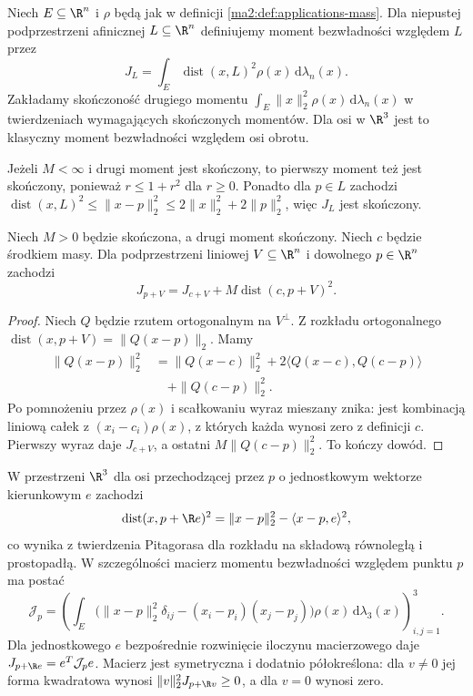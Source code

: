 \begin{definicja}
\label{ma2:def:applications-inertia}
Niech $E\subseteq\R^n$ i $\rho$ będą jak
w definicji \ref{ma2:def:applications-mass}.
Dla niepustej podprzestrzeni afinicznej
$L\subseteq\R^n$ definiujemy moment bezwładności
względem $L$ przez
\[
 J_L=\int_E \operatorname{dist}(x,L)^2
 \rho(x)\,\mathrm d\lambda_n(x).
\]
Zakładamy skończoność drugiego momentu
$\int_E\|x\|_2^2\rho(x)\,\mathrm d\lambda_n(x)$
w twierdzeniach wymagających skończonych momentów.
Dla osi w $\R^3$ jest to klasyczny
moment bezwładności względem osi obrotu.
\end{definicja}

Jeżeli $M<\infty$ i drugi moment jest skończony,
to pierwszy moment też jest skończony, ponieważ
$r\le 1+r^2$ dla $r\ge0$.
Ponadto dla $p\in L$ zachodzi
$\operatorname{dist}(x,L)^2\le
\|x-p\|_2^2\le2\|x\|_2^2+2\|p\|_2^2$,
więc $J_L$ jest skończony.

\begin{twierdzenie}
\label{ma2:thm:applications-steiner}
Niech $M>0$ będzie skończona, a drugi moment
skończony. Niech $c$ będzie środkiem masy.
Dla podprzestrzeni liniowej $V\subseteq\R^n$
i dowolnego $p\in\R^n$ zachodzi
\[
 J_{p+V}=J_{c+V}+
 M\operatorname{dist}(c,p+V)^2.
\]
\end{twierdzenie}
\begin{proof}
Niech $Q$ będzie rzutem ortogonalnym
na $V^\perp$. Z rozkładu ortogonalnego
$\operatorname{dist}(x,p+V)=\|Q(x-p)\|_2$.
Mamy
\[
 \begin{aligned}
 \|Q(x-p)\|_2^2
 &=\|Q(x-c)\|_2^2
 +2\langle Q(x-c),Q(c-p)\rangle\\
 &\quad+\|Q(c-p)\|_2^2.
 \end{aligned}
\]
Po pomnożeniu przez $\rho(x)$ i scałkowaniu
wyraz mieszany znika: jest kombinacją
liniową całek z $(x_i-c_i)\rho(x)$,
z których każda wynosi zero z definicji $c$.
Pierwszy wyraz daje $J_{c+V}$, a ostatni
$M\|Q(c-p)\|_2^2$. To kończy dowód.
\end{proof}

W przestrzeni $\R^3$ dla osi przechodzącej
przez $p$ o jednostkowym wektorze kierunkowym $e$
zachodzi
\[
 \operatorname{dist}(x,p+\R e)^2
 =\|x-p\|_2^2-\langle x-p,e\rangle^2,
\]
co wynika z twierdzenia Pitagorasa
dla rozkładu na składową równoległą i prostopadłą.
W szczególności macierz momentu bezwładności
względem punktu $p$ ma postać
\[
 \mathcal J_p=
 \left(
 \int_E\bigl(\|x-p\|_2^2\delta_{ij}
 -(x_i-p_i)(x_j-p_j)\bigr)\rho(x)
 \,\mathrm d\lambda_3(x)
 \right)_{i,j=1}^3.
\]
Dla jednostkowego $e$ bezpośrednie rozwinięcie
iloczynu macierzowego daje
$J_{p+\R e}=e^T\mathcal J_pe$.
Macierz jest symetryczna i dodatnio półokreślona:
dla $v\ne0$ jej forma kwadratowa wynosi
$\|v\|_2^2 J_{p+\R v}\ge0$, a dla $v=0$
wynosi zero.

